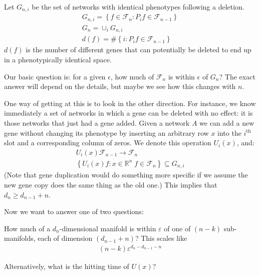 \documentclass[11 pt]{article}
\newcommand{\1}{\mathbbm{1}}
\begin{document}
  Let $G_{n,i}$ be the set of networks with identical phenotypes following a deletion. 
  \begin{align*}
        G_{n,i} = \left\{ f \in \mathcal{F}_{n} : P_{i}f \in \mathcal{F}_{n-1} \right\} \\
        G_{n} = \cup_{i} G_{n,i} \\
        d(f) = \# \left\{ i : P_{i}f \in \mathcal{F}_{n-1} \right\} 
  \end{align*}
$d(f)$ is the number of different genes that can potentially be deleted to end up in a phenotypically identical space. 

Our basic question is: for a given $\epsilon$,
how much of $\mathcal{F}_n$ is within $\epsilon$ of $G_n$?
The exact answer will depend on the details, but maybe we see how this changes with $n$.

One way of getting at this is to look in the other direction.
For instance, we know immediately a set of networks in which a gene can be deleted with no effect:
it is those networks that just had a gene added.
Given a network $A$ we can add a new gene without changing its phenotype
by inserting an arbitrary row $x$ into the $i^\text{th}$ slot
and a corresponding column of zeros.
We denote this operation $U_i(x)$, and:
  \begin{align*}
        U_{i}(x) \mathcal{F}_{n-1} \rightarrow \mathcal{F}_{n} \\
        \left\{ U_{i}(x) f : x \in \mathbb{R}^{n} \; f \in \mathcal{F}_n \right\} \subseteq G_{n,i} 
  \end{align*}
(Note that gene duplication would do something more specific
if we assume the new gene copy does the same thing as the old one.)
This implies that $d_n \ge d_{n-1} + n$.


Now we want to answer one of two questions:

How much of a $d_{n}$-dimensional manifold is within $\varepsilon$ of one of $(n-k)$ sub-manifolds, each of dimension $(d_{n-1}+n)$?
This scales like
\begin{align*}
(n-k)\varepsilon^{d_{n}-d_{n-1} - n}
\end{align*}

Alternatively, what is the hitting time of $U(x)$?
\end{document}
